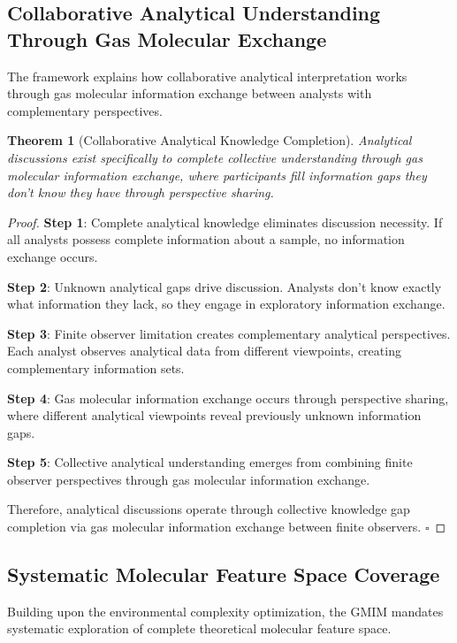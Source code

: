 \documentclass[11pt,a4paper]{article}
\newtheorem{theorem}{Theorem}[section]
\theoremstyle{remark}
\begin{document}
\subsection{Collaborative Analytical Understanding Through Gas Molecular Exchange}

The framework explains how collaborative analytical interpretation works through gas molecular information exchange between analysts with complementary perspectives.

\begin{theorem}[Collaborative Analytical Knowledge Completion]
Analytical discussions exist specifically to complete collective understanding through gas molecular information exchange, where participants fill information gaps they don't know they have through perspective sharing.
\end{theorem}

\begin{proof}
\textbf{Step 1}: Complete analytical knowledge eliminates discussion necessity. If all analysts possess complete information about a sample, no information exchange occurs.

\textbf{Step 2}: Unknown analytical gaps drive discussion. Analysts don't know exactly what information they lack, so they engage in exploratory information exchange.

\textbf{Step 3}: Finite observer limitation creates complementary analytical perspectives. Each analyst observes analytical data from different viewpoints, creating complementary information sets.

\textbf{Step 4}: Gas molecular information exchange occurs through perspective sharing, where different analytical viewpoints reveal previously unknown information gaps.

\textbf{Step 5}: Collective analytical understanding emerges from combining finite observer perspectives through gas molecular information exchange.

Therefore, analytical discussions operate through collective knowledge gap completion via gas molecular information exchange between finite observers. $\square$
\end{proof}

\subsection{Systematic Molecular Feature Space Coverage}

Building upon the environmental complexity optimization, the GMIM mandates systematic exploration of complete theoretical molecular feature space.
\end{document}
